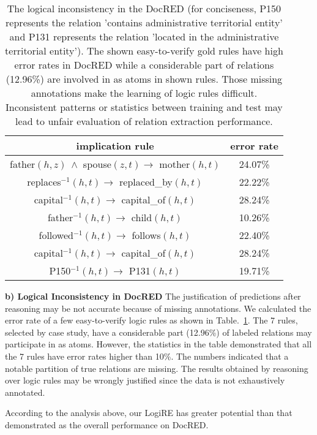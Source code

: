 \documentclass[11pt]{article}
\newcommand{\mymodel}{LogiRE\xspace}
\begin{document}
\begin{table}[t]
    \centering
    \small
    \begin{tabular}{cc}
    \toprule
        implication rule & error rate \\ \midrule
        father$(h,z)\ \land$ spouse$(z, t)\rightarrow$ mother$(h, t)$ & 24.07\% \\
        replaces$^{-1}(h,t)\rightarrow$ replaced\_by$(h, t)$ & 22.22\% \\
        capital$^{-1}(h,t)\rightarrow$ capital\_of$(h, t)$ & 28.24\% \\
        father$^{-1}(h, t)\rightarrow$ child$(h, t)$ & 10.26\% \\
        followed$^{-1}(h, t)\rightarrow$ follows$(h, t)$ & 22.40\% \\
        capital$^{-1}(h, t)\rightarrow$ capital\_of$(h, t)$ & 28.24\% \\
        P150$^{-1}(h, t)\rightarrow$ P131$(h,t)$ & 19.71\% \\
    \bottomrule
    \end{tabular}
    \caption{The logical inconsistency in the DocRED (for conciseness, P150 represents the relation 'contains administrative territorial entity' and P131 represents the relation 'located in the administrative territorial entity'). The shown easy-to-verify gold rules have high error rates in DocRED while a considerable part of relations (12.96\%) are involved in as atoms in shown rules. Those missing annotations make the learning of logic rules difficult. Inconsistent patterns or statistics between training and test may lead to unfair evaluation of relation extraction performance.}
    \label{tab:docred-logic}
\end{table}

\textbf{b) Logical Inconsistency in DocRED}
The justification of predictions after reasoning may be not accurate because of missing annotations. We calculated the error rate of a few easy-to-verify logic rules as shown in Table.~\ref{tab:docred-logic}. The 7 rules, selected by case study, have a considerable part (12.96\%) of labeled relations may participate in as atoms. However, the statistics in the table demonstrated that all the 7 rules have error rates higher than 10\%. The numbers indicated that a notable partition of true relations are missing. The results obtained by reasoning over logic rules may be wrongly justified since the data is not exhaustively annotated.

According to the analysis above, our \mymodel has greater potential than that demonstrated as the overall performance on DocRED.
\end{document}
